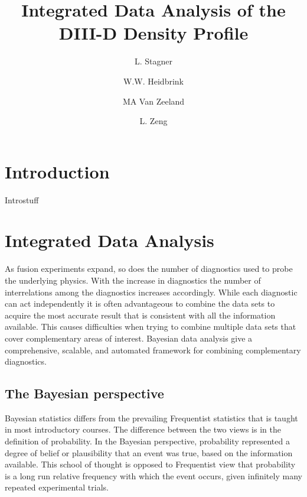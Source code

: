 \documentclass[12pt]{article}
\numberwithin{equation}{section}
\begin{document}
\title{\bf{Integrated Data Analysis of the DIII-D Density Profile}}
\author[1]{L. Stagner}
\author[1]{W.W. Heidbrink}
\author[2]{MA Van Zeeland}
\author[2]{L. Zeng}
\date{}
\maketitle
\begin{abstract}
\end{abstract}
\section{Introduction}
Introstuff

\section{Integrated Data Analysis}
As fusion experiments expand, so does the number of diagnostics used to probe the underlying physics. With the increase in diagnostics the number of interrelations among the diagnostics increases accordingly. While each diagnostic can act independently it is often advantageous to combine the data sets to acquire the most accurate result that is consistent with all the information available. This causes difficulties when trying to combine multiple data sets that cover complementary areas of interest. Bayesian data analysis give a comprehensive, scalable, and automated framework for combining complementary diagnostics.    

\subsection{The Bayesian perspective}
Bayesian statistics differs from the prevailing Frequentist statistics that is taught in most introductory courses. The difference between the two views is in the definition of probability. In the Bayesian perspective, probability represented a degree of belief or plausibility that an event was true, based on the information available. This school of thought is opposed to Frequentist view that probability is a long run relative frequency with which the event occurs, given infinitely many repeated experimental trials.\cite{von2011bayesian}
\end{document}
